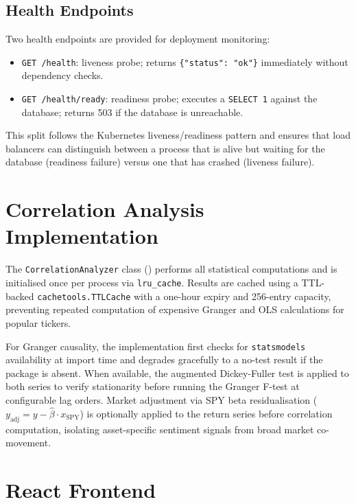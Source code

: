 \subsection{Health Endpoints}

Two health endpoints are provided for deployment monitoring:
\begin{itemize}
    \item \texttt{GET /health}: liveness probe; returns \texttt{\{"status": "ok"\}} immediately without dependency checks.
    \item \texttt{GET /health/ready}: readiness probe; executes a \texttt{SELECT 1} against the database; returns 503 if the database is unreachable.
\end{itemize}

This split follows the Kubernetes liveness/readiness pattern and ensures that load balancers can distinguish between a process that is alive but waiting for the database (readiness failure) versus one that has crashed (liveness failure).

\section{Correlation Analysis Implementation}
\label{sec:correlation_impl}

The \texttt{CorrelationAnalyzer} class () performs all statistical computations and is initialised once per process via \texttt{lru\_cache}.  Results are cached using a TTL-backed \texttt{cachetools.TTLCache} with a one-hour expiry and 256-entry capacity, preventing repeated computation of expensive Granger and OLS calculations for popular tickers.

For Granger causality, the implementation first checks for \texttt{statsmodels} availability at import time and degrades gracefully to a no-test result if the package is absent.  When available, the augmented Dickey-Fuller test is applied to both series to verify stationarity before running the Granger F-test at configurable lag orders.  Market adjustment via SPY beta residualisation ($y_\text{adj} = y - \hat{\beta} \cdot x_\text{SPY}$) is optionally applied to the return series before correlation computation, isolating asset-specific sentiment signals from broad market co-movement.

\section{React Frontend}
\label{sec:frontend_impl}

